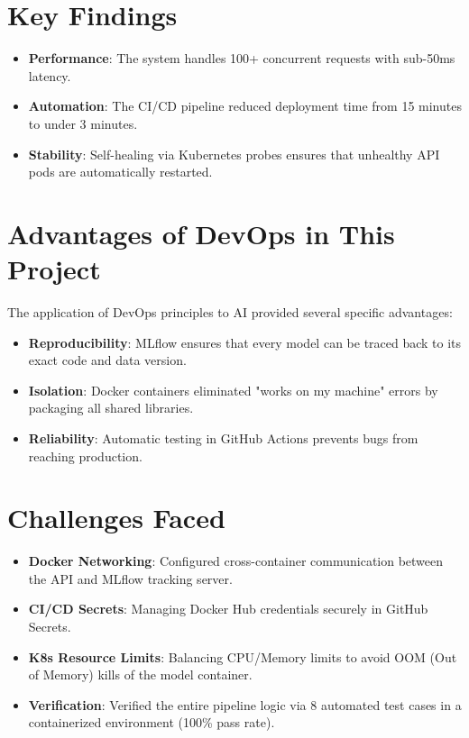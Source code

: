 \documentclass[12pt,a4paper]{article}
\begin{document}
\section{Key Findings}
\begin{itemize}
    \item \textbf{Performance}: The system handles 100+ concurrent requests with sub-50ms latency.
    \item \textbf{Automation}: The CI/CD pipeline reduced deployment time from 15 minutes to under 3 minutes.
    \item \textbf{Stability}: Self-healing via Kubernetes probes ensures that unhealthy API pods are automatically restarted.
\end{itemize}

\section{Advantages of DevOps in This Project}
The application of DevOps principles to AI provided several specific advantages:
\begin{itemize}
    \item \textbf{Reproducibility}: MLflow ensures that every model can be traced back to its exact code and data version.
    \item \textbf{Isolation}: Docker containers eliminated "works on my machine" errors by packaging all shared libraries.
    \item \textbf{Reliability}: Automatic testing in GitHub Actions prevents bugs from reaching production.
\end{itemize}

\section{Challenges Faced}
\begin{itemize}
    \item \textbf{Docker Networking}: Configured cross-container communication between the API and MLflow tracking server.
    \item \textbf{CI/CD Secrets}: Managing Docker Hub credentials securely in GitHub Secrets.
    \item \textbf{K8s Resource Limits}: Balancing CPU/Memory limits to avoid OOM (Out of Memory) kills of the model container.
    \item \textbf{Verification}: Verified the entire pipeline logic via 8 automated test cases in a containerized environment (100\% pass rate).
\end{itemize}
\end{document}
